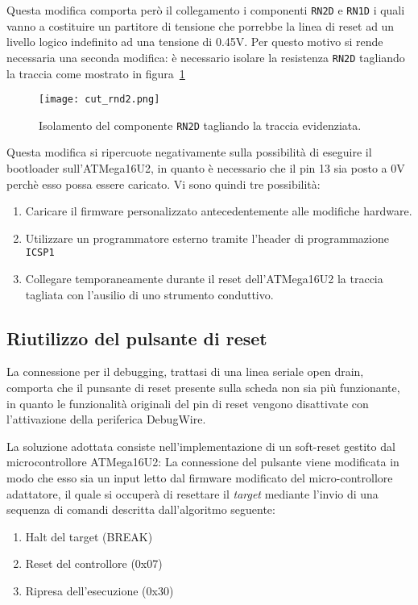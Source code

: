 Questa modifica comporta però il collegamento i componenti \texttt{RN2D} e \texttt{RN1D} i quali vanno a costituire un partitore di tensione che porrebbe la linea di reset ad un livello logico indefinito ad una tensione di 0.45V. Per questo motivo si rende necessaria una seconda modifica: è necessario isolare la resistenza \texttt{RN2D} tagliando la traccia come mostrato in figura~\ref{fig:cut-rnd2}

\begin{figure}[b]
    \centering
    \texttt{[image: cut\_rnd2.png]}
    \caption[]{Isolamento del componente \texttt{RN2D} tagliando la traccia evidenziata.}\label{fig:cut-rnd2}
\end{figure}

Questa modifica si ripercuote negativamente sulla possibilità di eseguire il bootloader sull'ATMega16U2, in quanto è necessario che il pin 13 sia posto a 0V perchè esso possa essere caricato. Vi sono quindi tre possibilità:
\begin{enumerate}
    \item Caricare il firmware personalizzato antecedentemente alle modifiche hardware.
    \item Utilizzare un programmatore esterno tramite l'header di programmazione \texttt{ICSP1}
    \item Collegare temporaneamente durante il reset dell'ATMega16U2 la traccia tagliata con l'ausilio di uno strumento conduttivo.
\end{enumerate} 

\subsection{Riutilizzo del pulsante di reset}

La connessione per il debugging, trattasi di una linea seriale open drain, comporta che il punsante di reset presente sulla scheda non sia più funzionante, in quanto le funzionalità originali del pin di reset vengono disattivate con l'attivazione della periferica DebugWire.

La soluzione adottata consiste nell'implementazione di un soft-reset gestito dal microcontrollore ATMega16U2: La connessione del pulsante viene modificata in modo che esso sia un input letto dal firmware modificato del micro-controllore adattatore, il quale si occuperà di resettare il \textit{target} mediante l'invio di una sequenza di comandi descritta dall'algoritmo seguente:
\begin{enumerate}
    \item Halt del target (BREAK)
    \item Reset del controllore (0x07)
    \item Ripresa dell'esecuzione (0x30)
\end{enumerate}

